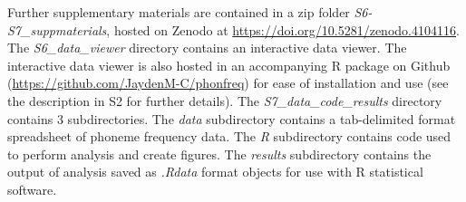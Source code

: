 Further supplementary materials are contained in a zip folder \emph{S6-S7\_suppmaterials}, hosted on Zenodo at \url{https://doi.org/10.5281/zenodo.4104116}. The \emph{S6\_data\_viewer} directory contains an interactive data viewer. The interactive data viewer is also hosted in an accompanying R package on Github (\url{https://github.com/JaydenM-C/phonfreq}) for ease of installation and use (see the description in S2 for further details). The \emph{S7\_data\_code\_results} directory contains 3 subdirectories. The \emph{data} subdirectory contains a tab-delimited format spreadsheet of phoneme frequency data. The \emph{R} subdirectory contains code used to perform analysis and create figures. The \emph{results} subdirectory contains the output of analysis saved as \emph{.Rdata} format objects for use with R statistical software.
